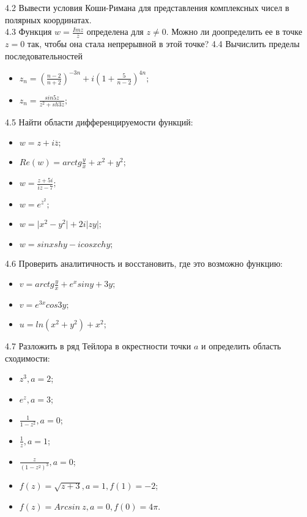 \documentclass{article}
\begin{document}
4.2 Вывести условия Коши-Римана для представления комплексных чисел в  полярных координатах. \\
4.3 Функция $w = \frac{Im z}{\overline{z}}$ определена для $z \neq 0$. Можно ли доопределить ее в точке $z = 0$ так, чтобы она стала непрерывной в этой точке? %
4.4 Вычислить пределы последовательностей
\begin{itemize}
\item $z_n = (\frac{n-2}{n+2})^{-3n} + i(1+\frac{5}{n-2})^{4n};$
\item $z_n=\frac{sin{5z}}{z^2+sh{3z}};$
\end{itemize}

4.5 Найти области дифференцируемости функций:
\begin{itemize}
\item $w=z+i\overline{z};$
\item $Re(w) = arctg \frac{y}{x} + x^2 + y^2;$
\item $w=\frac{z+5i}{iz-7};$
\item $w=e^{\overline{z}^2};$
\item $w=\vert x^2 - y^2 \vert +2i\vert zy \vert;$
\item $w=sin{x}sh{y} -i cos{x}ch{y};$
\end{itemize}

4.6 Проверить аналитичность и восстановить, где это возможно функцию:
\begin{itemize}
\item $v = arctg \frac{y}{x} +e^xsin{y}+3y;$
\item $v=e^{3x}cos{3y};$
\item $u=ln(x^2+y^2)+x^2;$
\end{itemize}

4.7 Разложить в ряд Тейлора в окрестности точки $a$ и определить область сходимости:
\begin{itemize}
\item $z^3, a=2$;
\item $e^z, a=3$;
\item $\frac{1}{1-z^2}, a=0$;
\item $\frac{1}{z}, a=1$;
\item $\frac{z}{(1-z^2)^3}, a=0$;
\item $f(z)=\sqrt{z+3}, a=1,f(1)=-2$;
\item $f(z)=Arcsin~z,a=0, f(0)=4\pi$.
\end{itemize}
\end{document}
